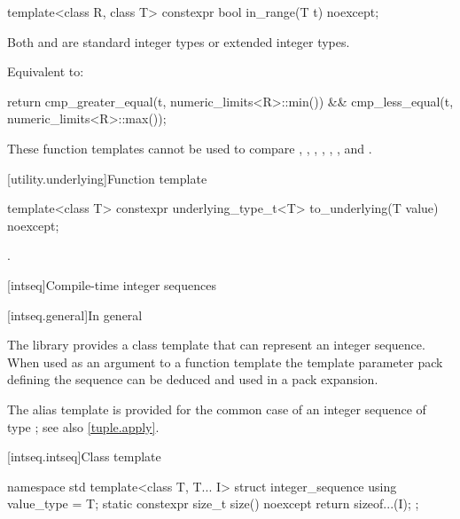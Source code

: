 %
\begin{itemdecl}
template<class R, class T>
  constexpr bool in_range(T t) noexcept;
\end{itemdecl}

\begin{itemdescr}
\pnum
\mandates
Both  and  are standard integer types or
extended integer types.

\pnum
\effects
Equivalent to:
\begin{codeblock}
return cmp_greater_equal(t, numeric_limits<R>::min()) &&
       cmp_less_equal(t, numeric_limits<R>::max());
\end{codeblock}
\end{itemdescr}

\pnum
\begin{note}
These function templates cannot be used to compare
,
,
,
,
,
, and
.
\end{note}

[utility.underlying]{Function template }

%
\begin{itemdecl}
template<class T>
  constexpr underlying_type_t<T> to_underlying(T value) noexcept;
\end{itemdecl}

\begin{itemdescr}
\pnum
\returns
{}.
\end{itemdescr}


[intseq]{Compile-time integer sequences}

[intseq.general]{In general}

\pnum
The library provides a class template that can represent an integer sequence.
When used as an argument to a function template the template parameter pack defining the
sequence can be deduced and used in a pack expansion.
\begin{note}
The  alias template is provided for the common case of
an integer sequence of type ; see also \ref{tuple.apply}.
\end{note}

[intseq.intseq]{Class template }

%
%
\begin{codeblock}
namespace std {
  template<class T, T... I> struct integer_sequence {
    using value_type = T;
    static constexpr size_t size() noexcept { return sizeof...(I); }
  };
}
\end{codeblock}

